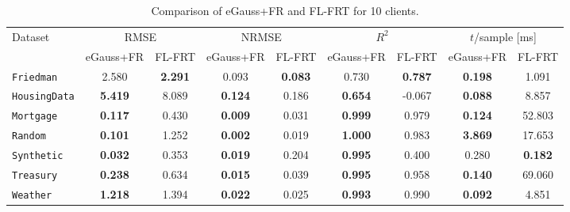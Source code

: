 \begin{table*}[!ht]
  \centering
  \caption{Comparison of {eGauss+FR} and {FL-FRT}  for 10 clients.}
  \begin{tabular}{l|cc|cc|cc|cc}
    \toprule
    \multirow{2}{*}{Dataset} & \multicolumn{2}{c}{RMSE} & \multicolumn{2}{c}{NRMSE} & \multicolumn{2}{c}{$R^2$} & \multicolumn{2}{c}{$t$/sample [ms]} \\
    & {eGauss+FR} & FL-FRT & {eGauss+FR} & FL-FRT & {eGauss+FR} & FL-FRT & {eGauss+FR} & FL-FRT \\
    \midrule
    \texttt{Friedman} & 2.580 & \textbf{2.291} & 0.093 & \textbf{0.083} & 0.730 & \textbf{0.787} & \textbf{0.198} & 1.091 \\
    \texttt{HousingData} & \textbf{5.419} & 8.089 & \textbf{0.124} & 0.186 & \textbf{0.654} & -0.067 & \textbf{0.088} & 8.857 \\
    \texttt{Mortgage} & \textbf{0.117} & 0.430 & \textbf{0.009} & 0.031 & \textbf{0.999} & 0.979 & \textbf{0.124} & 52.803 \\
    \texttt{Random} & \textbf{0.101} & 1.252 & \textbf{0.002} & 0.019 & \textbf{1.000} & 0.983 & \textbf{3.869} & 17.653 \\
    \texttt{Synthetic} & \textbf{0.032} & 0.353 & \textbf{0.019} & 0.204 & \textbf{0.995} & 0.400 & 0.280 & \textbf{0.182} \\
    \texttt{Treasury} & \textbf{0.238} & 0.634 & \textbf{0.015} & 0.039 & \textbf{0.995} & 0.958 & \textbf{0.140} & 69.060 \\
    \texttt{Weather} & \textbf{1.218} & 1.394 & \textbf{0.022} & 0.025 & \textbf{0.993} & 0.990 & \textbf{0.092} & 4.851 \\
    \bottomrule
  \end{tabular}
\end{table*}
